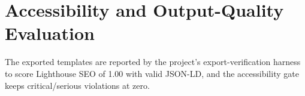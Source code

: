 \section{Accessibility and Output-Quality Evaluation}
The exported templates are reported by the project's export-verification harness
to score Lighthouse SEO of 1.00 with valid JSON-LD, and the accessibility gate
keeps critical/serious violations at zero. %
